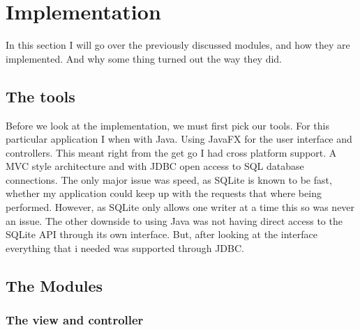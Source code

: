 \section{Implementation}
\label{sec:implementation}

In this section I will go over the previously discussed modules, and how they are implemented. And why some thing turned out the way they did.

\subsection{The tools}
\label{subsec:the_tools}

Before we look at the implementation, we must first pick our tools. For this particular application I when with Java. Using JavaFX for the user interface and controllers. This meant right from the get go I had cross platform support. A MVC style architecture and with JDBC open access to SQL database connections. The only major issue was speed, as SQLite is known to be fast, whether my application could keep up with the requests that where being performed. However, as SQLite only allows one writer at a time this so was never an issue. The other downside to using Java was not having direct access to the SQLite API through its own interface. But, after looking at the interface everything that i needed was supported through JDBC.

\subsection{The Modules}
\label{subsec:the_modules}

\subsubsection{The view and controller}
\label{subsubsec:imp_veiw}

